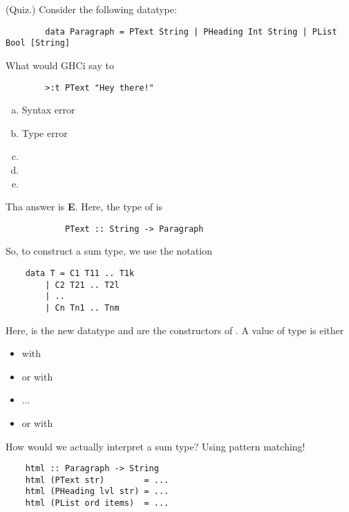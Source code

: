 \documentclass[letterpaper]{article}
\begin{document}
\begin{mdframed}[]
    (Quiz.) Consider the following datatype:
    \begin{verbatim}
        data Paragraph = PText String | PHeading Int String | PList Bool [String]\end{verbatim}
    What would GHCi say to 
    \begin{verbatim}
        >:t PText "Hey there!"\end{verbatim}
    
    \begin{enumerate}[(a)]
        \item Syntax error 
        \item Type error 
        \item {}
        \item {}
        \item {}
    \end{enumerate}

    \begin{mdframed}[]
        Tha answer is \textbf{E}. Here, the type of  is 
        \begin{verbatim}
            PText :: String -> Paragraph\end{verbatim}
    \end{mdframed}
\end{mdframed}
So, to construct a sum type, we use the notation 
\begin{verbatim}
    data T = C1 T11 .. T1k 
        | C2 T21 .. T2l 
        | .. 
        | Cn Tn1 .. Tnm \end{verbatim}
Here,  is the new datatype and  are the constructors of . A value of type  is either 
\begin{itemize}
    \item {} with 
    \item or  with 
    \item ... 
    \item or  with 
\end{itemize}
How would we actually interpret a sum type? Using pattern matching!
\begin{verbatim}
    html :: Paragraph -> String 
    html (PText str)        = ... 
    html (PHeading lvl str) = ...
    html (PList ord items)  = ...
\end{verbatim}
\end{document}
